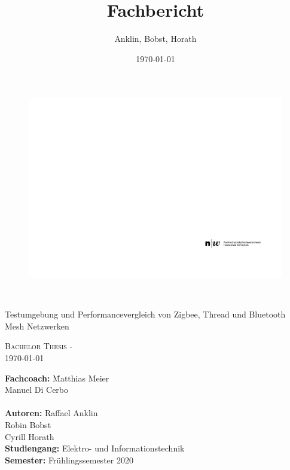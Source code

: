 \documentclass[final]{fhnwreport}       %
\title{Fachbericht}  		        %
\author{Anklin, Bobst, Horath}      				    %
\date{\today}          				   %
\begin{document}
\thispagestyle{empty}
	\begin{figure}
		 \vspace*{-\topskip}\vspace*{-\headsep}
		\includegraphics[scale=1]{graphics/fhnw_ht_logo_de.pdf}
	\end{figure}
	\begin{center}
		\vspace*{2cm}
		{\huge{\textbf{\thetitle}}}\\
		\vspace*{1cm}
		
		{\huge{Testumgebung und Performancevergleich von Zigbee, Thread und Bluetooth Mesh Netzwerken}}\\
		\vspace*{0.5cm}
		
		{\scshape\Large Bachelor Thesis - \theauthor \\} \Large{\today}
		\vfill
		
		
		\begin{normalsize}
			{\begin{tabbing}
						
					\textbf{Fachcoach:} \hspace{6cm}\= Matthias Meier\\
					\>Manuel Di Cerbo\\
					
					\\[0.4cm]
					
					\textbf{Autoren:} \>Raffael Anklin \\ \>Robin Bobst \\ \>Cyrill Horath
					\\[0.8cm]
					\textbf{Studiengang:} \>Elektro- und Informationstechnik
					\\[0.8cm]	\textbf{Semester:} \>Frühlingssemester 2020
			\end{tabbing}}
		\end{normalsize}
		\vfill
	\end{center}
\clearpage
\end{document}
